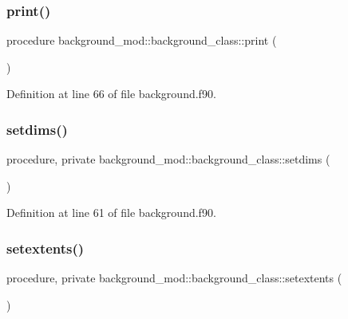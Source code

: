 \subsubsection{\texorpdfstring{print()}{print()}}
{\footnotesize\ttfamily procedure background\+\_\+mod\+::background\+\_\+class\+::print (\begin{DoxyParamCaption}{ }\end{DoxyParamCaption})\hspace{0.3cm}{\ttfamily [private]}}



Definition at line 66 of file background.\+f90.

\mbox{\label{structbackground__mod_1_1background__class_a5a4418427175db3e0d549fc328369993}} 
\subsubsection{\texorpdfstring{setdims()}{setdims()}}
{\footnotesize\ttfamily procedure, private background\+\_\+mod\+::background\+\_\+class\+::setdims (\begin{DoxyParamCaption}{ }\end{DoxyParamCaption})\hspace{0.3cm}{\ttfamily [private]}}



Definition at line 61 of file background.\+f90.

\mbox{\label{structbackground__mod_1_1background__class_a2265e90a0a0685465a17721576919af5}} 
\subsubsection{\texorpdfstring{setextents()}{setextents()}}
{\footnotesize\ttfamily procedure, private background\+\_\+mod\+::background\+\_\+class\+::setextents (\begin{DoxyParamCaption}{ }\end{DoxyParamCaption})\hspace{0.3cm}{\ttfamily [private]}}



